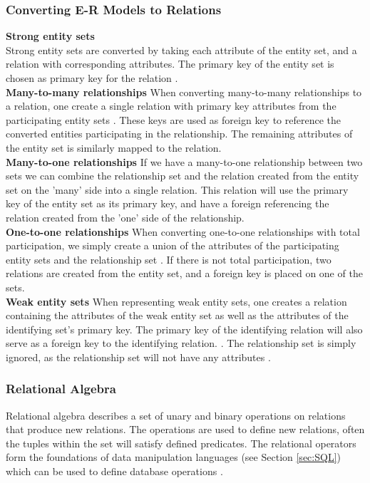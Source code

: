 \subsubsection*{Converting E-R Models to Relations}
\textbf{Strong entity sets}\\
Strong entity sets are converted by taking each attribute of the entity set, and a relation with corresponding attributes. 
The primary key of the entity set is chosen as primary key for the relation \cite{DBSBook}.\\
\textbf{Many-to-many relationships}
When converting many-to-many relationships to a relation, one create a single relation with primary key attributes from the participating entity sets \cite{DBSBook}. These keys are used as foreign key to reference the converted entities participating in the relationship. 
The remaining attributes of the entity set is similarly mapped to the relation.\\
\textbf{Many-to-one relationships}
If we have a many-to-one relationship between two sets we can combine the relationship set and the relation created from the entity set on the 'many' side into a single relation. This relation will use the primary key of the entity set as its primary key, and have a foreign referencing the relation created from the 'one' side of the relationship.\\
\textbf{One-to-one relationships}
When converting one-to-one relationships with total participation, we simply create a union of the attributes of the participating entity sets and the relationship set \cite{DBSBook}. If there is not total participation, two relations are created from the entity set, and a foreign key is placed on one of the sets.\\
\textbf{Weak entity sets}
When representing weak entity sets, one creates a relation containing the attributes of the weak entity set as well as the attributes of the identifying set's primary key.
The primary key of the identifying relation will also serve as a foreign key to the identifying relation. \cite{DBSBook}.
The relationship set is simply ignored, as the relationship set will not have any attributes \cite{DBSBook}. 



\subsubsection{Relational Algebra}\label{sec:relationalAlgebra}
Relational algebra describes a set of unary and binary operations on relations that produce new relations.
The operations are used to define new relations, often the tuples within the set will satisfy defined predicates.
The relational operators form the foundations of data manipulation languages (see Section \ref{sec:SQL}) which can be used to define database operations \cite{DBSBook}.


